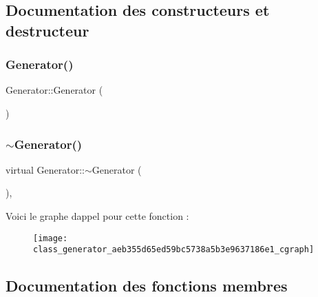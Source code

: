 \subsection{Documentation des constructeurs et destructeur}
\mbox{\label{class_generator_aaaf1e5f3a47ede3ef8a96a301ee04a10}} 
\subsubsection{\texorpdfstring{Generator()}{Generator()}}
{\footnotesize\ttfamily Generator\+::\+Generator (\begin{DoxyParamCaption}{ }\end{DoxyParamCaption})\hspace{0.3cm}{\ttfamily [inline]}}

\mbox{\label{class_generator_aeb355d65ed59bc5738a5b3e9637186e1}} 
\subsubsection{\texorpdfstring{$\sim$\+Generator()}{~Generator()}}
{\footnotesize\ttfamily virtual Generator\+::$\sim$\+Generator (\begin{DoxyParamCaption}{ }\end{DoxyParamCaption})\hspace{0.3cm}{\ttfamily [inline]}, {\ttfamily [virtual]}}

Voici le graphe d\textquotesingle{}appel pour cette fonction \+:\nopagebreak
\begin{figure}[H]
\begin{center}
\leavevmode
\texttt{[image: class\_generator\_aeb355d65ed59bc5738a5b3e9637186e1\_cgraph]}
\end{center}
\end{figure}


\subsection{Documentation des fonctions membres}
\mbox{\label{class_generator_a91197ce0544ad549cf3646957c33c0e9}} 

